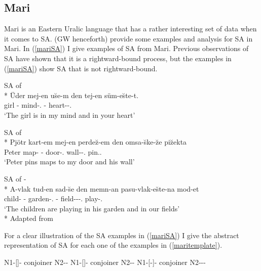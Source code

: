 \subsection{Mari}

Mari is an Eastern Uralic language that has a rather interesting set of data when it comes to SA. \cite{guseva2017postsyntactic} (GW henceforth) provide some examples and analysis for SA in Mari. In (\ref{mariSA}) I give examples of SA from Mari. Previous observations of SA have shown that it is a rightward-bound process, but the examples in (\ref{mariSA}) show SA that is not rightward-bound.

\begin{exe}
    \ex \label{mariSA}
    \begin{xlist}
        \ex SA of {\Iness}\\*
        \gll Üder mej-en u\u{s}e-m den tej-en süm-e\u{s}te-t. \\ 
        girl {\Fsg}-{\Gen} mind-{\Poss}.{\Fsg} {\And} {\Ssg}-{\Gen} heart-{\Iness}-{\Poss}.{\Ssg} \\
        \glt `The girl is in my mind and in your heart'
        
        \ex SA of {\Ill}\\*
        \gll Pjötr kart-em mej-en perde\u{z}-em den omsa-\u{s}ke-\u{z}e pi\u{z}ekta \\ 
        Peter map-{\Acc} {\Fsg}-{\Gen} door-{\Poss}.{\Fsg} {\And} wall-{\Ill}-{\Poss}.{\Tsg} pin.{\Tsg}.{\Prs}\\
        \glt `Peter pins maps to my door and his wall'
   
        \ex SA of {\Pl}-{\Iness}\\*
        \gll A-vlak tud-en sad-\u{s}e den memn-an pasu-vlak-e\u{s}te-na mod-et \\ 
        child-{\Pl} {\Tsg}-{\Gen} garden-{\Poss}.{\Tsg} {\And} {\Fpl}-{\Gen} field-{\Pl}-{\Iness}-{\Poss}.{\Fpl} play-{\Tpl}.{\Prs} \\
        \glt `The children are playing in his garden and in our fields'\\*
        \hfill Adapted from \cite{guseva2017postsyntactic}
    \end{xlist}     
\end{exe}

For a clear illustration of the SA examples in (\ref{mariSA}) I give the abstract representation of SA for each one of the examples in (\ref{maritemplate}).

\begin{exe}
    \ex \label{maritemplate}
        \begin{xlist}
        \ex N1-[{\Iness}]-{\Poss} conjoiner N2-{\Iness}-{\Poss}
        \ex N1-[{\Ill}]-{\Poss} conjoiner N2-{\Ill}-{\Poss}
        \ex N1-[{\Pl}-{\Iness}]-{\Poss} conjoiner N2-{\Pl}-{\Iness}-{\Poss}
    \end{xlist}
\end{exe}

